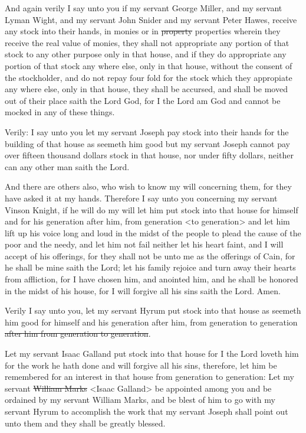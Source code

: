 				And again verily I say unto you if my servant George Miller, and my servant Lyman Wight, and my servant John Snider and my servant Peter Hawes, receive any stock into their hands, in monies or in \sout{property} properties wherein they receive the real value of monies, they shall not appropriate any portion of that stock to any other purpose only in that house, and if they do appropriate any portion of that stock any where else, only in that house, without the consent of the stockholder, and do not repay four fold for the stock which they appropiate any where else, only in that house, they shall be accursed, and shall be moved out of their place saith the Lord God, for I the Lord am God and cannot be mocked in any of these things.

				Verily: I say unto you let my servant Joseph pay stock into their hands for the building of that house as seemeth him good but my servant Joseph cannot pay over fifteen thousand dollars stock in that house, nor under fifty dollars, neither can any other man saith the Lord.

				And there are others also, who wish to know my will concerning them, for they have asked it at my hands. Therefore I say unto you concerning my servant Vinson Knight, if he will do my will let him put stock into that house for himself and for his generation after him, from generation <to generation> and let him lift up his voice long and loud in the midst of the people to plead the cause of the poor and the needy, and let him not fail neither let his heart faint, and I will accept of his offerings, for they shall not be unto me as the offerings of Cain, for he shall be mine saith the Lord; let his family rejoice and turn away their hearts from affliction, for I have chosen him, and anointed him, and he shall be honored in the midst of his house, for I will forgive all his sins saith the Lord. Amen.

				Verily I say unto you, let my servant Hyrum put stock into that house as seemeth him good for himself and his generation after him, from generation to generation \sout{after him from generation to generation}.

				Let my servant Isaac Galland put stock into that house for I the Lord loveth him for the work he hath done and will forgive all his sins, therefore, let him be remembered for an interest in that house from generation to generation: Let my servant \sout{William Marks} <Isaac Galland> be appointed among you and be ordained by my servant William Marks, and be blest of him to go with my servant Hyrum to accomplish the work that my servant Joseph shall point out unto them and they shall be greatly blessed.

